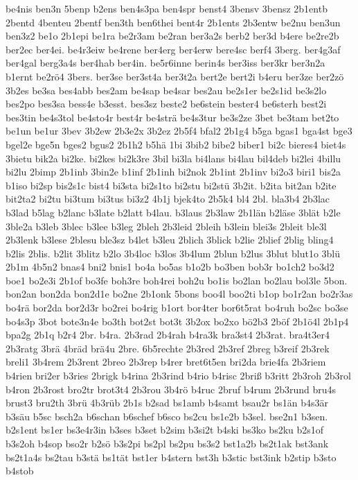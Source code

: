 {be4nis
ben3n
5benp
b2ens
ben4s3pa
ben4spr
benst4
3bensv
3bensz
2b1entb
2bentd
4benteu
2bentf
ben3th
ben6thei
bent4r
2b1ents
2b3entw
be2nu
ben3un
ben3z2
be1o
2b1epi
be1ra
be2r3am
be2ran
ber3a2s
berb2
ber3d
b4ere
be2re2b
ber2ec
ber4ei.
be4r3eiw
be4rene
ber4erg
ber4erw
bere4sc
berf4
3berg.
ber4g3af
ber4gal
berg3a4s
ber4hab
ber4in.
be5r6inne
berin4s
ber3iss
ber3kr
ber3n2a
b1ernt
be2rö4
3bers.
ber3se
ber3st4a
ber3t2a
bert2e
bert2i
b4eru
ber3ze
ber2zö
3b2es
be3sa
bes4abb
bes2am
be4sap
be4sar
bes2au
be2s1er
be2s1id
be3s2lo
bes2po
bes3sa
bess4e
b3esst.
bes3sz
beste2
be6stein
bester4
be6sterh
best2i
bes3tin
be4s3tol
be4sto4r
best4r
be4strä
be4s3tur
be3s2ze
3bet
be3tam
bet2to
be1un
be1ur
3bev
3b2ew
2b3e2x
3b2ez
2b5f4
bfal2
2b1g4
b5ga
bgas1
bga4st
bge3
bgel2e
bge5n
bges2
bgus2
2b1h2
b5hä
1bi
3bib2
bibe2
biber1
bi2c
bieres4
biet4s
3bietu
bik2a
bi2ke.
bi2kes
bi2k3re
3bil
bi3la
bi4lans
bi4lau
bil4deb
bi2lei
4billu
bi2lu
2bimp
2b1inb
3bin2e
b1inf
2b1inh
bi2nok
2b1int
2b1inv
bi2o3
biri1
bis2a
b1iso
bi2sp
bis2s1c
bist4
bi3sta
bi2s1to
bi2stu
bi2stü
3b2it.
b2ita
bit2an
b2ite
bit2ta2
bi2tu
bi3tum
bi3tus
bi3z2
4b1j
bjek4to
2b5k4
bl4
2bl.
bla3b4
2b3lac
b3lad
b5lag
b2lanc
b3late
b2latt
b4lau.
b3laus
2b3law
2b1län
b2läse
3blät
b2le
3ble2a
b3leb
3blec
b3lee
b3leg
2bleh
2b3leid
2bleih
b3lein
blei3s
2bleit
ble3l
2b3lenk
b3lese
2blesu
ble3sz
b4let
b3leu
2blich
3blick
b2lie
2blief
2blig
bling4
b2lis
2blis.
b2lit
3blitz
b2lo
3b4loc
b3los
3b4lum
2blun
b2lus
3blut
blut1o
3blü
2b1m
4b5n2
bnas4
bni2
bnis1
bo4a
bo5as
b1o2b
bo3ben
bob3r
bo1ch2
bo3d2
boe1
bo2e3i
2b1of
bo3fe
boh3re
boh4rei
boh2u
bo1is
bo2lan
bo2lau
bol3le
5bon.
bon2an
bon2da
bon2d1e
bo2ne
2b1onk
5bons
boo4l
boo2ti
b1op
bo1r2an
bo2r3as
bo4rä
bor2da
bor2d3r
bo2rei
bo4rig
b1ort
bor4ter
bor6t5rat
bo4ruh
bo2sc
bo3se
bo4s3p
3bot
bote3n4e
bo3th
bot2st
bot3t
3b2ox
bo2xo
bö2b3
2böf
2b1ö4l
2b1p4
bpa2g
2b1q
b2r4
2br.
b4ra.
2b3rad
2b4rah
b4ra3k
bra3st4
2b3rat.
bra4t3er4
2b3ratg
3brä
4bräd
brä4u
2bre.
6b5rechte
2b3red
2b3ref
2breg
b3reif
2b3rek
breli1
3b4rem
2b3rent
2breo
2b3rep
b4rer
bret6t5en
bri2da
brie4fa
2b3riem
b4rien
bri2er
b3ries
2brigk
b4rina
2b3rind
b4rio
b4risc
2briß
b3ritt
2b3roh
2b3rol
b4ron
2b3rost
bro2tr
brot3t4
2b3rou
3b4rö
b4ruc
2bruf
b4rum
2b3rund
bru4s
brust3
bru2th
3brü
4b3rüb
2b1s
b2sad
bs1amb
b4samt
bsau2r
bs1än
b4s3är
b3säu
b5sc
bsch2a
b6schan
b6schef
b6sco
bs2cu
bs1e2b
b3sel.
bse2n1
b3sen.
b2s1ent
bs1er
bs3e4r3in
b3ses
b3set
b2sim
b3si2t
b4ski
bs3ko
bs2ku
b2s1of
b3s2oh
b4sop
bso2r
b2sö
b3s2pi
bs2pl
bs2pu
bs3s2
bst1a2b
bs2t1ak
bst3ank
bs2t1a4s
bs2tau
b3stä
bs1tät
bst1er
b4stern
bst3h
b3stic
bst3ink
b2stip
b3sto
b4stob
}
